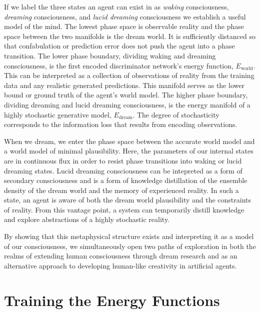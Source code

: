 \documentclass{article}
\begin{document}
If we label the three states an agent can exist in as \textit{waking} consciousness, \textit{dreaming} consciousness, and \textit{lucid dreaming} consciousness we establish a useful model of the mind. The lowest phase space is observable reality and the phase space between the two manifolds is the dream world. It is sufficiently distanced so that confabulation or prediction error does not push the agent into a phase transition. The lower phase boundary, dividing waking and dreaming consciousness, is the first encoded discriminator network's energy function, $E_{\text{world}}$. This can be interpreted as a collection of observations of reality from the training data and any realistic generated predictions. This manifold serves as the lower bound or ground truth of the agent's world model. The higher phase boundary, dividing dreaming and lucid dreaming consciousness, is the energy manifold of a highly stochastic generative model, $E_{\text{dream}}$. The degree of stochasticity corresponds to the information loss that results from encoding observations. 

When we dream, we enter the phase space between the accurate world model and a world model of minimal plausibility. Here, the parameters of our internal states are in continuous flux in order to resist phase transitions into waking or lucid dreaming states. Lucid dreaming consciousness can be intepreted as a form of secondary consciousness and is a form of knowledge distillation of the ensemble density of the dream world and the memory of experienced reality. In such a state, an agent is aware of both the dream world plausibility and the constraints of reality. From this vantage point, a system can temporarily distill knowledge and explore abstractions of a highly stochastic reality. 

By showing that this metaphysical structure exists and interpreting it as a model of our consciousness, we simultaneously open two paths of exploration in both the realms of extending human consciousness through dream research and as an alternative approach to developing human-like creativity in artificial agents.

\section{Training the Energy Functions}

\end{document}
